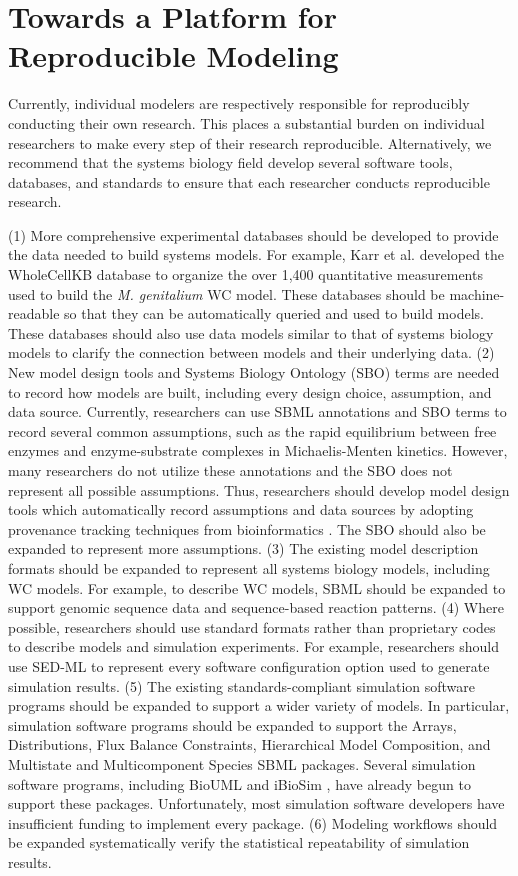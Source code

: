 \documentclass[journal,transmag,twoside]{IEEEtran}
\begin{document}
\section{Towards a Platform for Reproducible Modeling}

Currently, individual modelers are respectively responsible for reproducibly conducting their own research. This places a substantial burden on individual researchers to make every step of their research reproducible. Alternatively, we recommend that the systems biology field develop several software tools, databases, and standards to ensure that each researcher conducts reproducible research.

(1) More comprehensive experimental databases should be developed to provide the data needed to build systems models.  For example, Karr et al. developed the WholeCellKB database \cite{karr2013wholecellkb} to organize the over 1,400 quantitative measurements used to build the \textit{M. genitalium} WC model. These databases should be machine-readable so that they can be automatically queried and used to build models. These databases should also use data models similar to that of systems biology models to clarify the connection between models and their underlying data. (2) New model design tools and Systems Biology Ontology (SBO) \cite{juty2013systems} terms are needed to record how models are built, including every design choice, assumption, and data source. Currently, researchers can use SBML annotations and SBO terms to record several common assumptions, such as the rapid equilibrium between free enzymes and enzyme-substrate complexes in Michaelis-Menten kinetics. However, many researchers do not utilize these annotations and the SBO does not represent all possible assumptions. Thus, researchers should develop model design tools which automatically record assumptions and data sources by adopting provenance tracking techniques from bioinformatics \cite{callahan2006vistrails, hillman2012using, oinn2004taverna}. The SBO should also be expanded to represent more assumptions. (3) The existing model description formats should be expanded to represent all systems biology models, including WC models. For example, to describe WC models, SBML should be expanded to support genomic sequence data and sequence-based reaction patterns. (4) Where possible, researchers should use standard formats rather than proprietary codes to describe models and simulation experiments. For example, researchers should use SED-ML to represent every software configuration option used to generate simulation results. (5) The existing standards-compliant simulation software programs should be expanded to support a wider variety of models. In particular, simulation software programs should be expanded to support the Arrays, Distributions, Flux Balance Constraints, Hierarchical Model Composition, and Multistate and Multicomponent Species SBML packages. Several simulation software programs, including BioUML \cite{Kolpakov2006} and iBioSim \cite{Stevens2013}, have already begun to support these packages. Unfortunately, most simulation software developers have insufficient funding to implement every package. (6) Modeling workflows should be expanded systematically verify the statistical repeatability of simulation results. 
\end{document}
